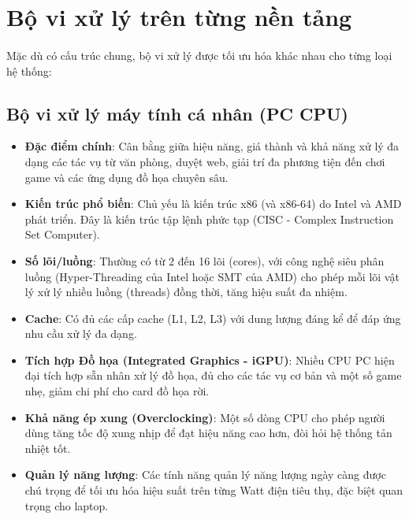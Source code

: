 \section{Bộ vi xử lý trên từng nền tảng}

\paragraph{}{Mặc dù có cấu trúc chung, bộ vi xử lý được tối ưu hóa khác nhau cho từng loại hệ thống:}

\subsection{Bộ vi xử lý máy tính cá nhân (PC CPU)}

\begin{itemize}
    \item \textbf{Đặc điểm chính}: Cân bằng giữa hiệu năng, giá thành và khả năng xử lý đa dạng các tác vụ từ văn phòng, duyệt web, giải trí đa phương tiện đến chơi game và các ứng dụng đồ họa chuyên sâu.
    \item \textbf{Kiến trúc phổ biến}: Chủ yếu là kiến trúc x86 (và x86-64) do Intel và AMD phát triển. Đây là kiến trúc tập lệnh phức tạp (CISC - Complex Instruction Set Computer).
    
    \item \textbf{Số lõi/luồng}: Thường có từ 2 đến 16 lõi (cores), với công nghệ siêu phân luồng (Hyper-Threading của Intel hoặc SMT của AMD) cho phép mỗi lõi vật lý xử lý nhiều luồng (threads) đồng thời, tăng hiệu suất đa nhiệm.
    
    \item \textbf{Cache}: Có đủ các cấp cache (L1, L2, L3) với dung lượng đáng kể để đáp ứng nhu cầu xử lý đa dạng.
    
    \item \textbf{Tích hợp Đồ họa (Integrated Graphics - iGPU)}: Nhiều CPU PC hiện đại tích hợp sẵn nhân xử lý đồ họa, đủ cho các tác vụ cơ bản và một số game nhẹ, giảm chi phí cho card đồ họa rời.
    
    \item \textbf{Khả năng ép xung (Overclocking)}: Một số dòng CPU cho phép người dùng tăng tốc độ xung nhịp để đạt hiệu năng cao hơn, đòi hỏi hệ thống tản nhiệt tốt.
    
    \item \textbf{Quản lý năng lượng}: Các tính năng quản lý năng lượng ngày càng được chú trọng để tối ưu hóa hiệu suất trên từng Watt điện tiêu thụ, đặc biệt quan trọng cho laptop.
\end{itemize}

